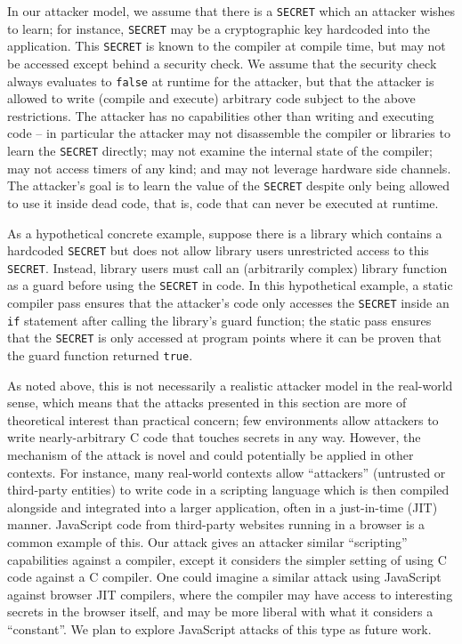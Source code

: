 In our attacker model, we assume that there is a \verb|SECRET| which an
attacker wishes to learn; for instance, \verb|SECRET| may be a cryptographic
key hardcoded into the application.
This \verb|SECRET| is known to the compiler at compile time, but may not be
accessed except behind a security check.
We assume that the security check always evaluates to \verb|false| at runtime
for the attacker, but that the attacker is allowed to write (\ie compile and
execute) arbitrary code subject to the above restrictions.
The attacker has no capabilities other than writing and executing code -- in
particular the attacker may not disassemble the compiler or libraries to learn
the \verb|SECRET| directly; may not examine the internal state of the compiler;
may not access timers of any kind; and may not leverage hardware side channels.
The attacker's goal is to learn the value of the \verb|SECRET| despite only
being allowed to use it inside dead code, that is, code that can never be
executed at runtime.

As a hypothetical concrete example, suppose there is a library which contains
a hardcoded \verb|SECRET| but does not allow library users unrestricted access
to this \verb|SECRET|.
Instead, library users must call an (arbitrarily complex) library function as
a guard before using the \verb|SECRET| in code.
In this hypothetical example, a static compiler pass ensures that the
attacker's code only accesses the \verb|SECRET| inside an \verb|if| statement
after calling the library's guard function; \ie the static pass ensures that
the \verb|SECRET| is only accessed at program points where it can be proven
that the guard function returned \verb|true|.

As noted above, this is not necessarily a realistic attacker model in the
real-world sense, which means that the attacks presented in this section
are more of theoretical interest than practical concern; few environments
allow attackers to write nearly-arbitrary C code that touches secrets in any
way.
However, the mechanism of the attack is novel and could potentially be applied
in other contexts.
For instance, many real-world contexts allow ``attackers'' (untrusted or
third-party entities) to write code in a scripting language which is then
compiled alongside and integrated into a larger application, often in a
just-in-time (JIT) manner.
JavaScript code from third-party websites running in a browser is a common
example of this.
Our attack gives an attacker similar ``scripting'' capabilities against a
compiler, except it considers the simpler setting of using C code against a C
compiler.
One could imagine a similar attack using JavaScript against browser JIT
compilers, where the compiler may have access to interesting secrets in the
browser itself, and may be more liberal with what it considers a ``constant''.
We plan to explore JavaScript attacks of this type as future work.

